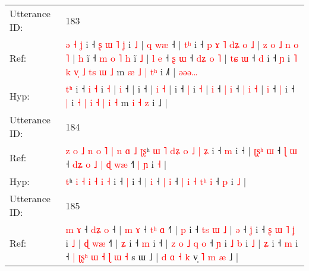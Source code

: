 \documentclass[10pt]{article}
\DeclareRobustCommand{\hl}[1]{{\textcolor{red}{#1}}}
\begin{document}
\begin{longtable}{ll}
 \\
\midrule
Utterance ID: & 183 \\
Ref: & \hl{ə}\hl{ }\hl{˧}\hl{ }\hl{ʝ} i ˧\hl{ }\hl{ʂ}\hl{ }\hl{ɯ} \hl{˥} \hl{ʝ} i \hl{˩} |\hl{ }\hl{q} \hl{w}\hl{æ} ˧ |\hl{ }\hl{t}\hl{ʰ} i ˧\hl{ }\hl{p}\hl{ }\hl{ɤ}\hl{ }\hl{˥}\hl{ }\hl{d}\hl{ʑ}\hl{ }\hl{o}\hl{ }\hl{˩} |\hl{ }\hl{z}\hl{ }\hl{o}\hl{ }\hl{˩}\hl{ }\hl{n} \hl{o} \hl{˥} |\hl{ }\hl{h} i\hl{̃} ˧\hl{ }\hl{m}\hl{ }\hl{o}\hl{ }\hl{˥} \hl{h} i\hl{̃} \hl{˩} |\hl{ }\hl{l} \hl{e} ˧ \hl{ʂ} \hl{ɯ} ˧ \hl{d}\hl{ʑ} \hl{o} \hl{˥} |\hl{ }\hl{t}\hl{ɕ} \hl{ɯ} ˧ \hl{d} i ˧ \hl{ɲ} i \hl{˥} \hl{k} \hl{v}\hl{̩} \hl{˩} \hl{t}\hl{s} \hl{ɯ} \hl{˩} m\hl{ }\hl{æ} \hl{˩} \hl{|} \hl{t}\hl{ʰ} i ˩\hl{˥} |\hl{ }\hl{ə}\hl{ə}\hl{ə}\hl{…}
 \\
Hyp: & \hl{}\hl{}\hl{}\hl{t}\hl{ʰ} i ˧\hl{}\hl{}\hl{}\hl{} \hl{i} \hl{˧} i \hl{˧} |\hl{}\hl{} \hl{}\hl{i} ˧ |\hl{}\hl{}\hl{} i ˧\hl{}\hl{}\hl{}\hl{}\hl{}\hl{}\hl{}\hl{}\hl{}\hl{}\hl{}\hl{}\hl{} |\hl{}\hl{}\hl{}\hl{}\hl{}\hl{}\hl{}\hl{} \hl{i} \hl{˧} |\hl{}\hl{} i\hl{} ˧\hl{}\hl{}\hl{}\hl{}\hl{}\hl{} \hl{|} i\hl{} \hl{˧} |\hl{}\hl{} \hl{i} ˧ \hl{|} \hl{i} ˧ \hl{}\hl{|} \hl{i} \hl{˧} |\hl{}\hl{}\hl{} \hl{i} ˧ \hl{|} i ˧ \hl{|} i \hl{˧} \hl{|} \hl{}\hl{i} \hl{˧} \hl{}\hl{|} \hl{i} \hl{˧} m\hl{}\hl{} \hl{i} \hl{˧} \hl{}\hl{z} i ˩\hl{} |\hl{}\hl{}\hl{}\hl{}\hl{}
 \\
\midrule
Utterance ID: & 184 \\
Ref: & \hl{z}\hl{ }\hl{o}\hl{ }\hl{˩}\hl{ }\hl{n}\hl{ }\hl{o}\hl{ }\hl{˥}\hl{ }\hl{|}\hl{ }\hl{n}\hl{ }\hl{ɑ}\hl{ }\hl{˩}\hl{ }\hl{ʈ}\hl{ʂ}ʰ\hl{ }\hl{ɯ} \hl{˥} \hl{d}\hl{ʑ} \hl{o} \hl{˩} \hl{|} \hl{ʑ} i ˧ \hl{m} i ˧ |\hl{ }\hl{ʈ}\hl{ʂ}\hl{ʰ} \hl{ɯ} ˧ \hl{ɭ} \hl{ɯ} ˧ \hl{d}\hl{ʑ} \hl{o} \hl{˩} \hl{|}\hl{ }\hl{ɖ} \hl{w}\hl{æ} ˧\hl{˥}\hl{ }\hl{|} \hl{ɲ} i \hl{˧} |
 \\
Hyp: & \hl{}\hl{}\hl{}\hl{}\hl{}\hl{}\hl{}\hl{}\hl{}\hl{}\hl{}\hl{}\hl{}\hl{}\hl{}\hl{}\hl{}\hl{}\hl{}\hl{}\hl{}\hl{t}ʰ\hl{}\hl{} \hl{i} \hl{}\hl{˧} \hl{i} \hl{˧} \hl{i} \hl{˧} i ˧ \hl{|} i ˧ |\hl{}\hl{}\hl{}\hl{} \hl{i} ˧ \hl{|} \hl{i} ˧ \hl{}\hl{|} \hl{i} \hl{˧} \hl{}\hl{t}\hl{ʰ} \hl{}\hl{i} ˧\hl{}\hl{}\hl{} \hl{p} i \hl{˩} |
 \\
\midrule
Utterance ID: & 185 \\
Ref: & \hl{m} \hl{ɤ} ˧\hl{ }\hl{d}\hl{ʑ} \hl{o} ˧ |\hl{ }\hl{m} \hl{ɤ} ˧ \hl{t}\hl{ʰ} \hl{ɑ} ˧\hl{˥} |\hl{ }\hl{p} i ˧\hl{ }\hl{t}\hl{s}\hl{ }\hl{ɯ}\hl{ }\hl{˩} | \hl{ə} ˧ \hl{ʝ} i ˧\hl{ }\hl{ʂ}\hl{ }\hl{ɯ}\hl{ }\hl{˥} \hl{ʝ} i \hl{˩} |\hl{ }\hl{ɖ} \hl{w}\hl{æ} ˧\hl{˥} |\hl{ }\hl{ʑ} i ˧ \hl{m} i ˧ |\hl{ }\hl{z} \hl{o} \hl{˩} \hl{q} \hl{o} ˧ \hl{ɲ} i \hl{˩} \hl{b} i \hl{˩} |\hl{ }\hl{ʑ} i ˧ \hl{m} i ˧ \hl{|} \hl{ʈ}\hl{ʂ}\hl{ʰ} \hl{ɯ} \hl{˧} \hl{ɭ} \hl{ɯ} \hl{˧}\hl{ }s ɯ ˩ |\hl{ }\hl{d}\hl{ }\hl{ɑ}\hl{ }\hl{˧} \hl{k} v̩\hl{ }\hl{˥}\hl{ }\hl{m}\hl{ }\hl{æ} ˩ |

\end{longtable}
\end{document}
